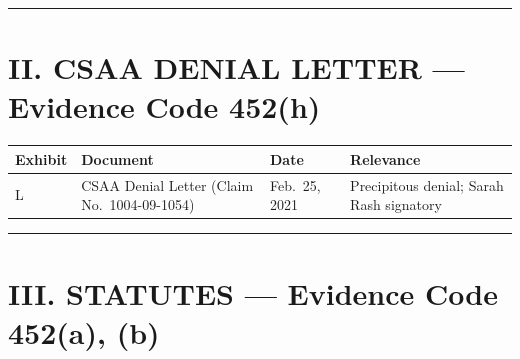 \begin{center}\rule{0.5\linewidth}{0.5pt}\end{center}

\section{II. CSAA DENIAL LETTER --- Evidence Code \textsection{} 452(h)}\label{ii.-csaa-denial-letter-evidence-code-452h}

{\def\LTcaptype{table} %
\begin{longtable}[]{@{}
  >{\raggedright\arraybackslash}p{}
  >{\raggedright\arraybackslash}p{}
  >{\raggedright\arraybackslash}p{}
  >{\raggedright\arraybackslash}p{}@{}}
\toprule\noalign{}
\begin{minipage}[b]{\linewidth}\raggedright
Exhibit
\end{minipage} & \begin{minipage}[b]{\linewidth}\raggedright
Document
\end{minipage} & \begin{minipage}[b]{\linewidth}\raggedright
Date
\end{minipage} & \begin{minipage}[b]{\linewidth}\raggedright
Relevance
\end{minipage} \\
\midrule\noalign{}
\endhead
\bottomrule\noalign{}
\endlastfoot
L & CSAA Denial Letter (Claim No.~1004-09-1054) & Feb.~25, 2021 & Precipitous denial; Sarah Rash signatory \\
\end{longtable}
}

\begin{center}\rule{0.5\linewidth}{0.5pt}\end{center}

\section{III. STATUTES --- Evidence Code \textsection{} 452(a), (b)}\label{iii.-statutes-evidence-code-452a-b}

